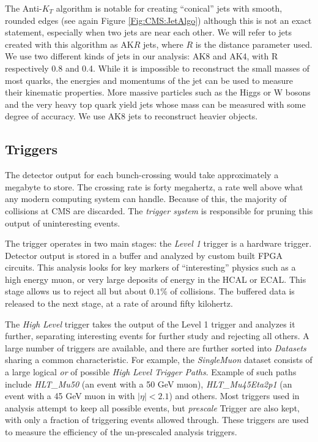 The Anti-$K_{T}$ algorithm is notable for creating ``conical'' jets with smooth, rounded edges (see again Figure \ref{Fig:CMS:JetAlgo}) although this is not an exact statement, especially when two jets are near each other. We will refer to jets created with this algorithm as AK$R$ jets, where $R$ is the distance parameter used. We use two different kinds of jets in our analysis: AK8 and AK4, with R respectively 0.8 and 0.4. While it is impossible to reconstruct the small masses of most quarks, the energies and momentums of the jet can be used to measure their kinematic properties. More massive particles such as the Higgs or W bosons and the very heavy top quark yield jets whose mass can be measured with some degree of accuracy. We use AK8 jets to reconstruct heavier objects.

\subsection{Triggers}
The detector output for each bunch-crossing would take approximately a megabyte to store. The crossing rate is forty megahertz, a rate well above what any modern computing system can handle. Because of this, the majority of collisions at CMS are discarded. The \textit{trigger system} is responsible for pruning this output of uninteresting events.

The trigger operates in two main stages: the \textit{Level 1} trigger is a hardware trigger. Detector output is stored in a buffer and analyzed by custom built FPGA circuits. This analysis looks for key markers of ``interesting'' physics such as a high energy muon, or very large deposits of energy in the HCAL or ECAL. This stage allows us to reject all but about $0.1\%$ of collisions. The buffered data is released to the next stage, at a rate of around fifty kilohertz.

The \textit{High Level} trigger takes the output of the Level 1 trigger and analyzes it further, separating interesting events for further study and rejecting all others. A large number of triggers are available, and there are further sorted into \textit{Datasets} sharing a common characteristic. For example, the \textit{SingleMuon} dataset consists of a large logical \textit{or} of possible \textit{ High Level Trigger Paths}. Example of such paths include \textit{HLT\_Mu50} (an event with a 50 GeV muon), \textit{HLT\_Mu45Eta2p1} (an event with a 45 GeV muon in with $|\eta| < 2.1$) and others. Most triggers used in analysis attempt to keep all possible events, but \textit{prescale} Trigger are also kept, with only a fraction of triggering events allowed through. These triggers are used to measure the efficiency of the un-prescaled analysis triggers.

